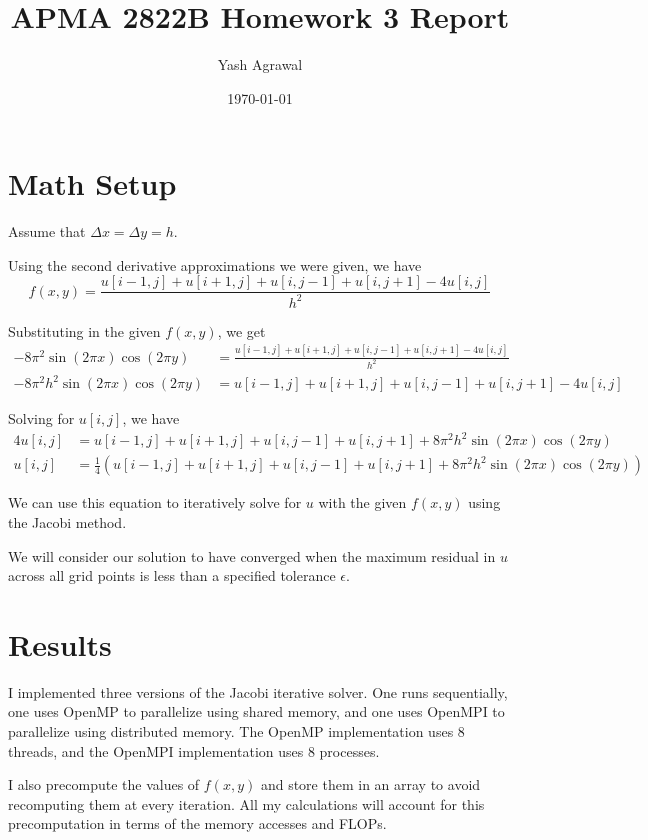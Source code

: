 \documentclass[11pt]{article}
\title{APMA 2822B Homework 3 Report}
\author{Yash Agrawal}
\date{\today}
\begin{document}
\maketitle

\section*{Math Setup}
Assume that $\Delta x = \Delta y = h$. 

Using the second derivative approximations we were given, we have
\[
    f(x, y) = \frac{u[i-1, j] + u[i+1, j] + u[i, j-1] + u[i, j+1] - 4u[i, j]}{h^2}
\]

Substituting in the given $f(x, y)$, we get
\begin{align*}
    -8\pi^2 \sin(2\pi x) \cos(2\pi y) &= \frac{u[i-1, j] + u[i+1, j] + u[i, j-1] + u[i, j+1] - 4u[i, j]}{h^2} \\
    -8\pi^2 h^2 \sin(2\pi x) \cos(2\pi y) &= u[i-1, j] + u[i+1, j] + u[i, j-1] + u[i, j+1] - 4u[i, j]
\end{align*}

Solving for $u[i, j]$, we have
\begin{align*}
    4u[i, j] &= u[i-1, j] + u[i+1, j] + u[i, j-1] + u[i, j+1] + 8\pi^2 h^2 \sin(2\pi x) \cos(2\pi y) \\
    u[i, j] &= \frac{1}{4} \left( u[i-1, j] + u[i+1, j] + u[i, j-1] + u[i, j+1] + 8\pi^2 h^2 \sin(2\pi x) \cos(2\pi y) \right)
\end{align*}

We can use this equation to iteratively solve for $u$ with the given $f(x, y)$ using the Jacobi method. 

We will consider our solution to have converged when the maximum residual in $u$ across all grid points is less than a specified tolerance $\epsilon$.

\section*{Results}

I implemented three versions of the Jacobi iterative solver. One runs sequentially, one uses OpenMP to parallelize using shared memory, and one uses OpenMPI to parallelize using distributed memory. The OpenMP implementation uses 8 threads, and the OpenMPI implementation uses 8 processes. 

I also precompute the values of $f(x, y)$ and store them in an array to avoid recomputing them at every iteration. All my calculations will account for this precomputation in terms of the memory accesses and FLOPs.
\end{document}
